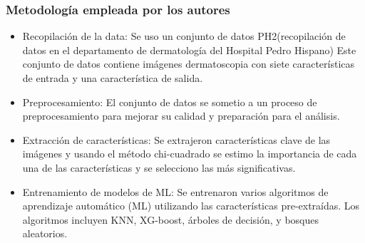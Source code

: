 \subsubsection{Metodología empleada por los autores}

\newcommand{\TPSCone}{Recopilación de la data: Se uso un conjunto de datos PH2(recopilación de datos en el departamento de dermatología del Hospital Pedro Hispano)
Este conjunto de datos contiene imágenes dermatoscopia con siete características de entrada y una característica de salida.

}

\newcommand{\TPSCtwo}{ Preprocesamiento: El conjunto de datos se sometio a un proceso de preprocesamiento para mejorar su calidad y preparación para el análisis.}

\newcommand{\TPSCthree}{Extracción de características: Se extrajeron características clave de las imágenes
y usando el método chi-cuadrado se estimo la importancia de cada una de las características y se selecciono las más significativas.
}


\newcommand{\TPSCfour}{ Entrenamiento de modelos de ML: Se entrenaron varios algoritmos de aprendizaje automático (ML) utilizando las características pre-extraídas. Los algoritmos incluyen KNN, XG-boost, árboles de decisión, y bosques aleatorios.
}

\begin{itemize}
	\item \TPSCone
	\item \TPSCtwo
	\item \TPSCthree
	\item \TPSCfour
	
\end{itemize}



